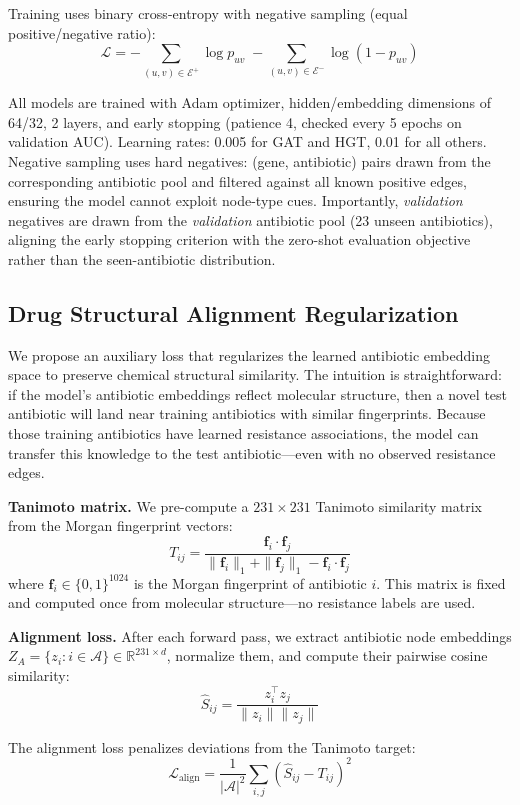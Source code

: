 \documentclass[conference]{IEEEtran}
\begin{document}
Training uses binary cross-entropy with negative sampling (equal positive/negative ratio):
$$\mathcal{L} = -\!\!\sum_{(u,v) \in \mathcal{E}^+}\!\! \log p_{uv} \;-\!\!\sum_{(u,v) \in \mathcal{E}^-}\!\! \log(1 - p_{uv})$$

All models are trained with Adam optimizer, hidden/embedding dimensions of 64/32, 2 layers, and early stopping (patience 4, checked every 5 epochs on validation AUC). Learning rates: 0.005 for GAT and HGT, 0.01 for all others. Negative sampling uses hard negatives: (gene, antibiotic) pairs drawn from the corresponding antibiotic pool and filtered against all known positive edges, ensuring the model cannot exploit node-type cues. Importantly, \textit{validation} negatives are drawn from the \textit{validation} antibiotic pool (23 unseen antibiotics), aligning the early stopping criterion with the zero-shot evaluation objective rather than the seen-antibiotic distribution.

\subsection{Drug Structural Alignment Regularization}
\label{sec:structalign}

We propose an auxiliary loss that regularizes the learned antibiotic embedding space to preserve chemical structural similarity. The intuition is straightforward: if the model's antibiotic embeddings reflect molecular structure, then a novel test antibiotic will land near training antibiotics with similar fingerprints. Because those training antibiotics have learned resistance associations, the model can transfer this knowledge to the test antibiotic---even with no observed resistance edges.

\textbf{Tanimoto matrix.} We pre-compute a $231 \times 231$ Tanimoto similarity matrix from the Morgan fingerprint vectors:
$$T_{ij} = \frac{\mathbf{f}_i \cdot \mathbf{f}_j}{\|\mathbf{f}_i\|_1 + \|\mathbf{f}_j\|_1 - \mathbf{f}_i \cdot \mathbf{f}_j}$$
where $\mathbf{f}_i \in \{0,1\}^{1024}$ is the Morgan fingerprint of antibiotic $i$. This matrix is fixed and computed once from molecular structure---no resistance labels are used.

\textbf{Alignment loss.} After each forward pass, we extract antibiotic node embeddings $Z_A = \{z_i : i \in \mathcal{A}\} \in \mathbb{R}^{231 \times d}$, normalize them, and compute their pairwise cosine similarity:
$$\hat{S}_{ij} = \frac{z_i^\top z_j}{\|z_i\| \|z_j\|}$$

The alignment loss penalizes deviations from the Tanimoto target:
$$\mathcal{L}_{\text{align}} = \frac{1}{|\mathcal{A}|^2}\sum_{i,j} \left(\hat{S}_{ij} - T_{ij}\right)^2$$
\end{document}
